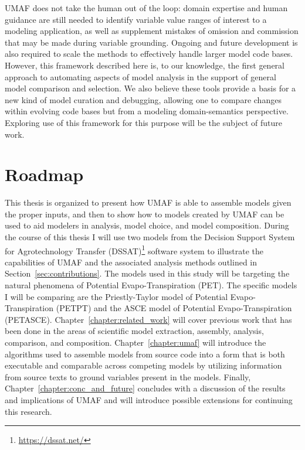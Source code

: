 UMAF does not take the human out of the loop: domain expertise and human guidance are still needed to identify variable value ranges of interest to a modeling application, as well as supplement mistakes of omission and commission that may be made during variable grounding.
Ongoing and future development is also required to scale the methods to effectively handle larger model code bases.
However, this framework described here is, to our knowledge, the first general approach to automating aspects of model analysis in the support of general model comparison and selection.
We also believe these tools provide a basis for a new kind of model curation and debugging, allowing one to compare changes within evolving code bases but from a modeling domain-semantics perspective. Exploring use of this framework for this purpose will be the subject of future work.

\section{Roadmap\label{sec:roadmap}}
This thesis is organized to present how UMAF is able to assemble models given the proper inputs, and then to show how to models created by UMAF can be used to aid modelers in analysis, model choice, and model composition.
During the course of this thesis I will use two models from the Decision Support System for Agrotechnology Transfer (DSSAT)\footnote{\url{https://dssat.net/}} software system \citep{DSSAT} to illustrate the capabilities of UMAF and the associated analysis methods outlined in Section~\ref{sec:contributions}.
The models used in this study will be targeting the natural phenomena of Potential Evapo-Transpiration (PET).
The specific models I will be comparing are the Priestly-Taylor model of Potential Evapo-Transpiration (PETPT) and the ASCE model of Potential Evapo-Transpiration (PETASCE).
Chapter~\ref{chapter:related_work} will cover previous work that has been done in the areas of scientific model extraction, assembly, analysis, comparison, and composition.
Chapter~\ref{chapter:umaf} will introduce the algorithms used to assemble models from source code into a form that is both executable and comparable across competing models by utilizing information from source texts to ground variables present in the models.
Finally, Chapter~\ref{chapter:conc_and_future} concludes with a discussion of the results and implications of UMAF and will introduce possible extensions for continuing this research.
